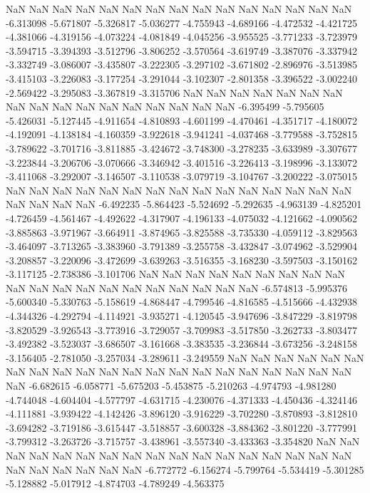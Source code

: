 NaN
NaN
NaN
NaN
NaN
NaN
NaN
NaN
NaN
NaN
NaN
NaN
NaN
NaN
NaN
-6.313098
-5.671807
-5.326817
-5.036277
-4.755943
-4.689166
-4.472532
-4.421725
-4.381066
-4.319156
-4.073224
-4.081849
-4.045256
-3.955525
-3.771233
-3.723979
-3.594715
-3.394393
-3.512796
-3.806252
-3.570564
-3.619749
-3.387076
-3.337942
-3.332749
-3.086007
-3.435807
-3.222305
-3.297102
-3.671802
-2.896976
-3.513985
-3.415103
-3.226083
-3.177254
-3.291044
-3.102307
-2.801358
-3.396522
-3.002240
-2.569422
-3.295083
-3.367819
-3.315706
NaN
NaN
NaN
NaN
NaN
NaN
NaN
NaN
NaN
NaN
NaN
NaN
NaN
NaN
NaN
NaN
NaN
-6.395499
-5.795605
-5.426031
-5.127445
-4.911654
-4.810893
-4.601199
-4.470461
-4.351717
-4.180072
-4.192091
-4.138184
-4.160359
-3.922618
-3.941241
-4.037468
-3.779588
-3.752815
-3.789622
-3.701716
-3.811885
-3.424672
-3.748300
-3.278235
-3.633989
-3.307677
-3.223844
-3.206706
-3.070666
-3.346942
-3.401516
-3.226413
-3.198996
-3.133072
-3.411068
-3.292007
-3.146507
-3.110538
-3.079719
-3.104767
-3.200222
-3.075015
NaN
NaN
NaN
NaN
NaN
NaN
NaN
NaN
NaN
NaN
NaN
NaN
NaN
NaN
NaN
NaN
NaN
NaN
NaN
-6.492235
-5.864423
-5.524692
-5.292635
-4.963139
-4.825201
-4.726459
-4.561467
-4.492622
-4.317907
-4.196133
-4.075032
-4.121662
-4.090562
-3.885863
-3.971967
-3.664911
-3.874965
-3.825588
-3.735330
-4.059112
-3.829563
-3.464097
-3.713265
-3.383960
-3.791389
-3.255758
-3.432847
-3.074962
-3.529904
-3.208857
-3.220096
-3.472699
-3.639263
-3.516355
-3.168230
-3.597503
-3.150162
-3.117125
-2.738386
-3.101706
NaN
NaN
NaN
NaN
NaN
NaN
NaN
NaN
NaN
NaN
NaN
NaN
NaN
NaN
NaN
NaN
NaN
NaN
NaN
NaN
-6.574813
-5.995376
-5.600340
-5.330763
-5.158619
-4.868447
-4.799546
-4.816585
-4.515666
-4.432938
-4.344326
-4.292794
-4.114921
-3.935271
-4.120545
-3.947696
-3.847229
-3.819798
-3.820529
-3.926543
-3.773916
-3.729057
-3.709983
-3.517850
-3.262733
-3.803477
-3.492382
-3.523037
-3.686507
-3.161668
-3.383535
-3.236844
-3.673256
-3.248158
-3.156405
-2.781050
-3.257034
-3.289611
-3.249559
NaN
NaN
NaN
NaN
NaN
NaN
NaN
NaN
NaN
NaN
NaN
NaN
NaN
NaN
NaN
NaN
NaN
NaN
NaN
NaN
NaN
NaN
-6.682615
-6.058771
-5.675203
-5.453875
-5.210263
-4.974793
-4.981280
-4.744048
-4.604404
-4.577797
-4.631715
-4.230076
-4.371333
-4.450436
-4.324146
-4.111881
-3.939422
-4.142426
-3.896120
-3.916229
-3.702280
-3.870893
-3.812810
-3.694282
-3.719186
-3.615447
-3.518857
-3.600328
-3.884362
-3.801220
-3.777991
-3.799312
-3.263726
-3.715757
-3.438961
-3.557340
-3.433363
-3.354820
NaN
NaN
NaN
NaN
NaN
NaN
NaN
NaN
NaN
NaN
NaN
NaN
NaN
NaN
NaN
NaN
NaN
NaN
NaN
NaN
NaN
NaN
NaN
-6.772772
-6.156274
-5.799764
-5.534419
-5.301285
-5.128882
-5.017912
-4.874703
-4.789249
-4.563375

